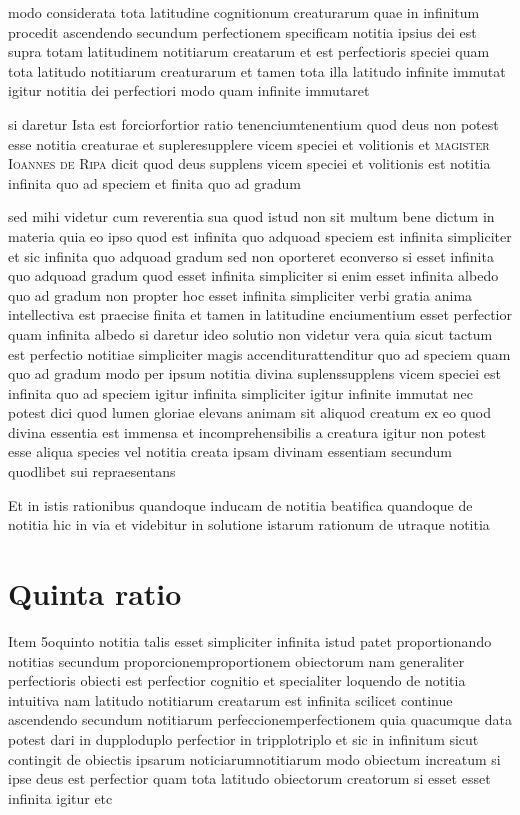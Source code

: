\documentclass[twoside, openright]{report}
\newcommand{\name}[1]{\textsc{#1}}
\begin{document}
        \pstart
        modo considerata tota latitudine cognitionum creaturarum quae in infinitum procedit ascendendo secundum perfectionem specificam notitia ipsius dei est supra totam latitudinem notitiarum creatarum et est perfectioris speciei quam tota latitudo notitiarum creaturarum et tamen tota illa latitudo infinite immutat igitur notitia dei perfectiori modo quam infinite immutaret
        \pend
     
        \pstart
        si daretur Ista est forciorfortior ratio tenenciumtenentium quod deus non potest esse notitia creaturae et supleresupplere vicem speciei et volitionis et \name{magister Ioannes de Ripa} dicit quod deus supplens vicem speciei et volitionis est notitia infinita quo ad speciem et finita quo ad gradum
        \pend
     
        \pstart
        sed mihi videtur cum reverentia sua quod istud non sit multum bene dictum in materia quia eo ipso quod est infinita quo adquoad speciem est infinita simpliciter et sic infinita quo adquoad gradum sed non oporteret econverso si esset infinita quo adquoad gradum quod esset infinita simpliciter si enim esset infinita albedo quo ad gradum non propter hoc esset infinita simpliciter verbi gratia anima intellectiva est praecise finita et tamen in latitudine enciumentium esset perfectior quam infinita albedo si daretur ideo solutio non videtur vera quia sicut tactum est perfectio notitiae simpliciter magis accenditurattenditur quo ad speciem quam quo ad gradum modo per ipsum notitia divina suplenssupplens vicem speciei est infinita quo ad speciem igitur infinita simpliciter igitur infinite immutat nec potest dici quod lumen gloriae elevans animam sit aliquod creatum ex eo quod divina essentia est immensa et incomprehensibilis a creatura igitur non potest esse aliqua species vel notitia creata ipsam divinam essentiam secundum quodlibet sui repraesentans
        \pend
     
        \pstart
        Et in istis rationibus quandoque inducam de notitia beatifica quandoque de notitia hic in via et videbitur in solutione istarum rationum de utraque notitia
        \pend
      
        \bigskip
         \section*{Quinta ratio} 
        \pstart
        Item 5oquinto notitia talis esset simpliciter infinita istud patet proportionando notitias secundum proporcionemproportionem obiectorum nam generaliter perfectioris obiecti est perfectior cognitio et specialiter loquendo de notitia intuitiva nam latitudo notitiarum creatarum est infinita scilicet continue ascendendo secundum notitiarum perfeccionemperfectionem quia quacumque data potest dari in dupploduplo perfectior in tripplotriplo et sic in infinitum sicut contingit de obiectis ipsarum noticiarumnotitiarum modo obiectum increatum si ipse deus est perfectior quam tota latitudo obiectorum creatorum si esset esset infinita igitur etc
        \pend
     
\end{document}
